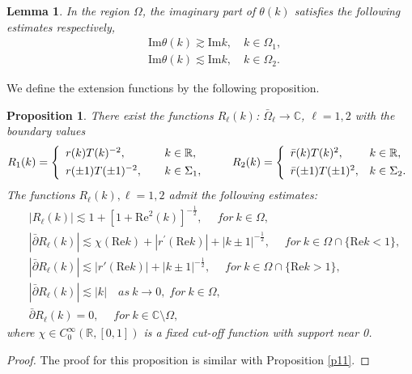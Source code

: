 \documentclass[11pt]{article}
\numberwithin{equation}{section}
\newtheorem{lemma}{Lemma}
\newtheorem{Proposition}{Proposition}
\begin{document}
\begin{lemma}\label{l9}
    In the region $\Omega$, the imaginary part of $\theta(k)$ satisfies the following estimates respectively,
    \begin{align}
         &\mathrm{Im}\theta(k)\gtrsim\mathrm{Im}k,\quad k\in\Omega_{1},\\
        &\mathrm{Im}\theta(k)\lesssim \mathrm{Im}k,\quad k\in\Omega_{2}.
    \end{align}
\end{lemma}

We define the extension functions by the following proposition.

\begin{Proposition}\label{p30}
    There exist  the functions $R_{\ell}(k)$: $\bar{\Omega}_{\ell}\to \mathbb{C}$, $\ell=1,2$  with the boundary values
	\begin{align} R_{1}(k)=\left\{\begin{array}{ll}
	r(k)T(k)^{-2}, &\hspace{0.4cm}k\in \mathbb{R},\\[4pt]
 r(\pm1)T(\pm1)^{-2},  &\hspace{0.4cm}k\in \Sigma_{1},\\
	\end{array}\right. \quad\quad
	R_{2}(k)=\left\{\begin{array}{ll} \bar{r}(k)T(k)^{2},
 &k\in  \mathbb{R},\\[4pt] \bar{r}(\pm1)T(\pm1)^{2}, &k\in \Sigma_{2}.
	\end{array} \right.
	\end{align}	
The functions  $R_{\ell}(k), \ell=1,2$  admit the following estimates:
	\begin{align*}
    &|R_{\ell}(k)|\lesssim 1+\left[1+\mathrm{Re}^2(k)\right]^{-\frac{1}{2}},\quad\;for\ k \in\Omega,\\
    &|\bar{\partial}R_{\ell}(k)|\lesssim\chi(\mathrm{Re}k)+|r^\prime(\mathrm{Re}k)|+|k\pm1|^{-\frac{1}{2}}, \quad   \;for\  k\in \Omega\cap\{\mathrm{Re}k<1\},\\
	&|\bar{\partial}R_{\ell}(k)|\lesssim|r'(\mathrm{Re}k)|+|k\pm1|^{-\frac{1}{2}}, \quad  \;for\   k\in \Omega\cap\{\mathrm{Re}k>1\},\\
&|\bar{\partial}R_{\ell}(k)|\lesssim|k| \quad as\ k\to0,\;for\ k\in \Omega,\\
&\bar{\partial}R_{\ell}(k)=0,\quad \;for\ k\in\mathbb{C}\setminus\Omega,\nonumber
	\end{align*}
where $\chi \in C^{\infty}_0(\mathbb{R},[0,1])$ is a fixed cut-off function with support near 0.
\end{Proposition}
\begin{proof}
    The proof for this proposition is similar with Proposition \ref{p11}.
\end{proof}
\end{document}
